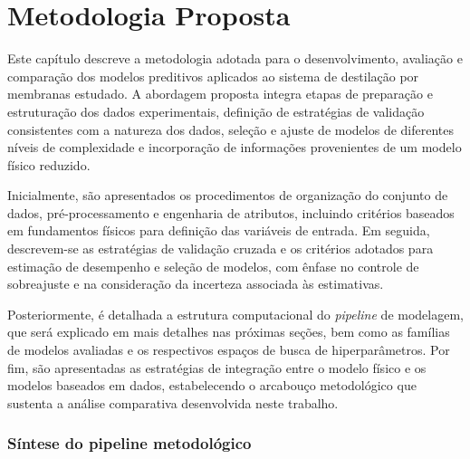 \chapter{Metodologia Proposta}
\label{chap4}


Este capítulo descreve a metodologia adotada para o desenvolvimento, avaliação e comparação dos modelos preditivos aplicados ao sistema de destilação por membranas estudado. A abordagem proposta integra etapas de preparação e estruturação dos dados experimentais, definição de estratégias de validação consistentes com a natureza dos dados, seleção e ajuste de modelos de diferentes níveis de complexidade e incorporação de informações provenientes de um modelo físico reduzido.

Inicialmente, são apresentados os procedimentos de organização do conjunto de dados, pré-processamento e engenharia de atributos, incluindo critérios baseados em fundamentos físicos para definição das variáveis de entrada. Em seguida, descrevem-se as estratégias de validação cruzada e os critérios adotados para estimação de desempenho e seleção de modelos, com ênfase no controle de sobreajuste e na consideração da incerteza associada às estimativas.

Posteriormente, é detalhada a estrutura computacional do \textit{pipeline} de modelagem, que será explicado em mais detalhes nas próximas seções, bem como as famílias de modelos avaliadas e os respectivos espaços de busca de hiperparâmetros. Por fim, são apresentadas as estratégias de integração entre o modelo físico e os modelos baseados em dados, estabelecendo o arcabouço metodológico que sustenta a análise comparativa desenvolvida neste trabalho.

\subsection{Síntese do pipeline metodológico}

